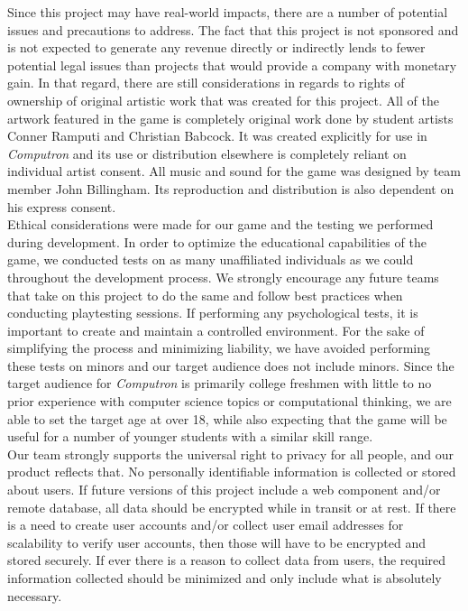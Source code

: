 Since this project may have real-world impacts, there are a number of potential issues and precautions to address. The fact that this project is not sponsored and is not expected to generate any revenue directly or indirectly lends to fewer potential legal issues than projects that would provide a company with monetary gain. In that regard, there are still considerations in regards to rights of ownership of original artistic work that was created for this project. All of the artwork featured in the game is completely original work done by student artists Conner Ramputi and Christian Babcock. It was created explicitly for use in \textit{Computron} and its use or distribution elsewhere is completely reliant on individual artist consent. All music and sound for the game was designed by team member John Billingham. Its reproduction and distribution is also dependent on his express consent.\\

Ethical considerations were made for our game and the testing we performed during development. In order to optimize the educational capabilities of the game, we conducted tests on as many unaffiliated individuals as we could throughout the development process. We strongly encourage any future teams that take on this project to do the same and follow best practices when conducting playtesting sessions. If performing any psychological tests, it is important to create and maintain a controlled environment. For the sake of simplifying the process and minimizing liability, we have avoided performing these tests on minors and our target audience does not include minors. Since the target audience for \textit{Computron} is primarily college freshmen with little to no prior experience with computer science topics or computational thinking, we are able to set the target age at over 18, while also expecting that the game will be useful for a number of younger students with a similar skill range.\\

Our team strongly supports the universal right to privacy for all people, and our product reflects that. No personally identifiable information is collected or stored about users. If future versions of this project include a web component and/or remote database, all data should be encrypted while in transit or at rest. If there is a need to create user accounts and/or collect user email addresses for scalability to verify user accounts, then those will have to be encrypted and stored securely. If ever there is a reason to collect data from users, the required information collected should be minimized and only include what is absolutely necessary.